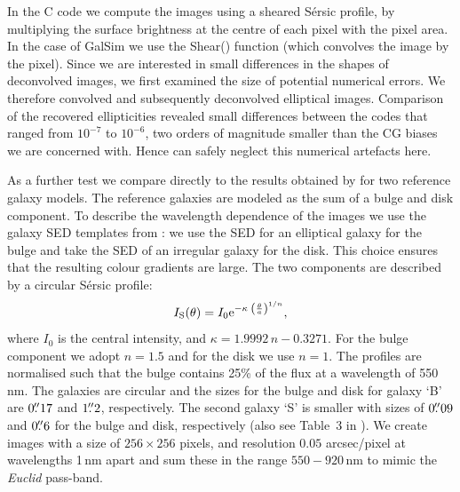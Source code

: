 \documentclass[useAMS,usenatbib]{mnras}
\newcommand{\be}{\begin{equation}}
\newcommand{\ee}{\end{equation}}
\begin{document}
In the C code we compute the images using a sheared S{\'e}rsic profile,
by multiplying the surface brightness at the centre of each pixel with the pixel area. In the case of {\sc GalSim} we use the {\sc Shear()} function (which convolves the image by the pixel). Since we are interested in small differences in the shapes of
deconvolved images, we first examined the size of potential numerical errors. We therefore convolved and
subsequently deconvolved elliptical images. Comparison of the recovered ellipticities revealed small differences between the codes that ranged from $10^{-7}$ to $10^{-6}$, two orders of magnitude
smaller than the CG biases we are concerned with. Hence can safely neglect this numerical artefacts here.

As a further test we compare directly to the results obtained by  for two reference galaxy models.  The reference galaxies are modeled as the sum of a bulge and disk component. To describe the wavelength dependence of the images we use the galaxy SED templates from \citet{1980ApJS...43..393C}: we use the SED for an elliptical galaxy for the bulge and take the SED of an irregular galaxy for the disk. This choice ensures that the resulting colour gradients are large. The two components are  described by a circular S{\'e}rsic profile:
\be
I_{\rm S}(\theta) = I_0 {\rm e}^{-\kappa\; \left(\frac{\theta}{a}\right)^{1/n}},
\ee
%
where $I_0$ is the central intensity, and $\kappa=1.9992\,n -0.3271$. For the bulge component we adopt $n=1.5$ and for the disk we use $n=1$. The profiles are normalised such that the bulge contains 25\% of the flux at a wavelength of 550\,nm. The galaxies are circular and the sizes for the bulge and disk for galaxy `B'   are $0\hbox{$.\!\!^{\prime\prime}$}17$ and $1\hbox{$.\!\!^{\prime\prime}$}2$, respectively. The second galaxy `S' is smaller with sizes of $0\hbox{$.\!\!^{\prime\prime}$}09$ and $0\hbox{$.\!\!^{\prime\prime}$}6$  for the bulge and disk, respectively (also see Table~3 in ). We create images with a size of  $256\times256$ pixels, and resolution $0.05$ arcsec/pixel at wavelengths 1\,nm apart and sum these in the range $550-920$\,nm to mimic the {\it Euclid} pass-band.
\end{document}
